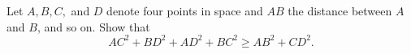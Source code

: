 Let $ A,B,C,$ and $ D$ denote four points in space and $ AB$ the distance between $ A$ and $ B$,  and so on. Show that \[ AC^2+BD^2+AD^2+BC^2 \ge AB^2+CD^2.\]